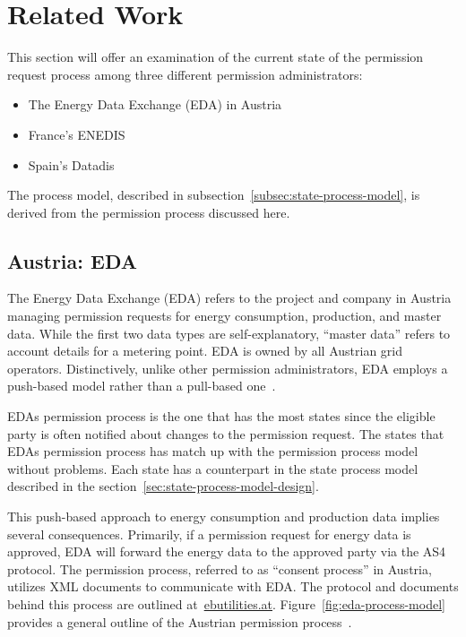 \section{Related Work}\label{sec:related-work}
This section will offer an examination of the current state of the permission request process among three different permission administrators:
\begin{itemize}
    \item{}The Energy Data Exchange (EDA) in Austria
    \item{}France's ENEDIS
    \item{}Spain's Datadis
\end{itemize}

The process model, described in subsection\ \ref{subsec:state-process-model}, is derived from the permission process discussed here.

\subsection{Austria: EDA}\label{subsec:austria:-eda}
The Energy Data Exchange (EDA) refers to the project and company in Austria managing permission requests for energy consumption,
production, and master data.
While the first two data types are self-explanatory, ``master data'' refers to account details for a metering point.
EDA is owned by all Austrian grid operators.
Distinctively, unlike other permission administrators, EDA employs a push-based model rather than a pull-based one~\cite{eda}.

EDAs permission process is the one that has the most states since the eligible party is often notified about changes to the permission request.
The states that EDAs permission process has match up with the permission process model without problems.
Each state has a counterpart in the state process model described in the section\ \ref{sec:state-process-model-design}.

This push-based approach to energy consumption and production data implies several consequences.
Primarily, if a permission request for energy data is approved,
EDA will forward the energy data to the approved party via the AS4 protocol\cite{eda}.
The permission process, referred to as ``consent process'' in Austria, utilizes XML documents to communicate with EDA.
The protocol and documents behind this process are outlined at\ \href{https://www.ebutilities.at/}{ebutilities.at}.
Figure\ \ref{fig:eda-process-model} provides a general outline of the Austrian permission process~\cite{ebutilities}.


